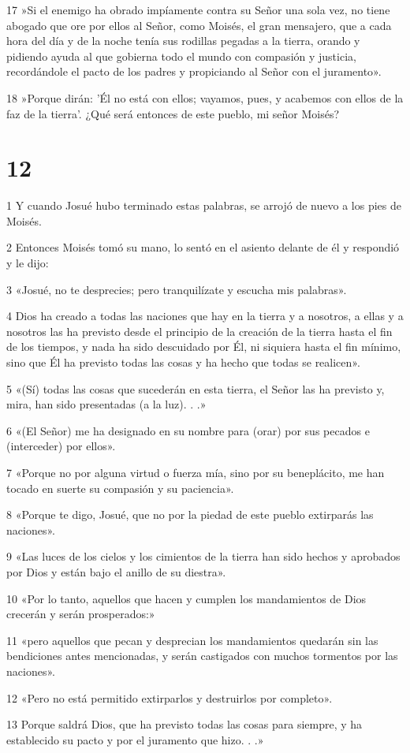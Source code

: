 \par 17 »Si el enemigo ha obrado impíamente contra su Señor una sola vez, no tiene abogado que ore por ellos al Señor, como Moisés, el gran mensajero, que a cada hora del día y de la noche tenía sus rodillas pegadas a la tierra, orando y pidiendo ayuda al que gobierna todo el mundo con compasión y justicia, recordándole el pacto de los padres y propiciando al Señor con el juramento».
\par 18 »Porque dirán: 'Él no está con ellos; vayamos, pues, y acabemos con ellos de la faz de la tierra'. ¿Qué será entonces de este pueblo, mi señor Moisés?

\chapter{12}

\par 1 Y cuando Josué hubo terminado estas palabras, se arrojó de nuevo a los pies de Moisés.
\par 2 Entonces Moisés tomó su mano, lo sentó en el asiento delante de él y respondió y le dijo:
\par 3 «Josué, no te desprecies; pero tranquilízate y escucha mis palabras».
\par 4 Dios ha creado a todas las naciones que hay en la tierra y a nosotros, a ellas y a nosotros las ha previsto desde el principio de la creación de la tierra hasta el fin de los tiempos, y nada ha sido descuidado por Él, ni siquiera hasta el fin mínimo, sino que Él ha previsto todas las cosas y ha hecho que todas se realicen».
\par 5 «(Sí) todas las cosas que sucederán en esta tierra, el Señor las ha previsto y, mira, han sido presentadas (a la luz). . .»
\par 6 «(El Señor) me ha designado en su nombre para (orar) por sus pecados e (interceder) por ellos».
\par 7 «Porque no por alguna virtud o fuerza mía, sino por su beneplácito, me han tocado en suerte su compasión y su paciencia».
\par 8 «Porque te digo, Josué, que no por la piedad de este pueblo extirparás las naciones».
\par 9 «Las luces de los cielos y los cimientos de la tierra han sido hechos y aprobados por Dios y están bajo el anillo de su diestra».
\par 10 «Por lo tanto, aquellos que hacen y cumplen los mandamientos de Dios crecerán y serán prosperados:»
\par 11 «pero aquellos que pecan y desprecian los mandamientos quedarán sin las bendiciones antes mencionadas, y serán castigados con muchos tormentos por las naciones».
\par 12 «Pero no está permitido extirparlos y destruirlos por completo».
\par 13 Porque saldrá Dios, que ha previsto todas las cosas para siempre, y ha establecido su pacto y por el juramento que hizo. . .»

